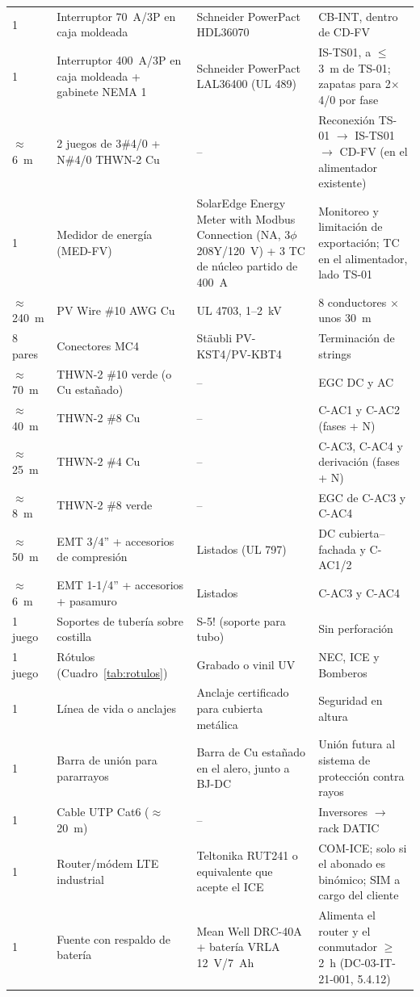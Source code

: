 \documentclass[12pt]{article}
\begin{document}
{\begin{longtable}{L{1.4cm}L{4.3cm}L{4.4cm}L{4.2cm}}
1 & Interruptor 70~A/3P en caja moldeada & Schneider PowerPact HDL36070 & CB-INT, dentro de CD-FV\\
1 & Interruptor 400~A/3P en caja moldeada + gabinete NEMA 1 & Schneider PowerPact LAL36400 (UL 489) & IS-TS01, a $\leq$ 3~m de TS-01; zapatas para 2$\times$4/0 por fase\\
$\approx$6~m & 2 juegos de 3\#4/0 + N\#4/0 THWN-2 Cu & -- & Reconexión TS-01 $\rightarrow$ IS-TS01 $\rightarrow$ CD-FV (en el alimentador existente)\\
1 & Medidor de energía (MED-FV) & SolarEdge Energy Meter with Modbus Connection (NA, 3$\phi$ 208Y/120~V) + 3 TC de núcleo partido de 400~A & Monitoreo y limitación de exportación; TC en el alimentador, lado TS-01\\
$\approx$240~m & PV Wire \#10 AWG Cu & UL 4703, 1--2~kV & 8 conductores $\times$ unos 30~m\\
8 pares & Conectores MC4 & Stäubli PV-KST4/PV-KBT4 & Terminación de strings\\
$\approx$70~m & THWN-2 \#10 verde (o Cu estañado) & -- & EGC DC y AC\\
$\approx$40~m & THWN-2 \#8 Cu & -- & C-AC1 y C-AC2 (fases + N)\\
$\approx$25~m & THWN-2 \#4 Cu & -- & C-AC3, C-AC4 y derivación (fases + N)\\
$\approx$8~m & THWN-2 \#8 verde & -- & EGC de C-AC3 y C-AC4\\
$\approx$50~m & EMT 3/4'' + accesorios de compresión & Listados (UL 797) & DC cubierta--fachada y C-AC1/2\\
$\approx$6~m & EMT 1-1/4'' + accesorios + pasamuro & Listados & C-AC3 y C-AC4\\
1 juego & Soportes de tubería sobre costilla & S-5! (soporte para tubo) & Sin perforación\\
1 juego & Rótulos (Cuadro~\ref{tab:rotulos}) & Grabado o vinil UV & NEC, ICE y Bomberos\\
1 & Línea de vida o anclajes & Anclaje certificado para cubierta metálica & Seguridad en altura\\
1 & Barra de unión para pararrayos & Barra de Cu estañado en el alero, junto a BJ-DC & Unión futura al sistema de protección contra rayos\\
1 & Cable UTP Cat6 ($\approx$20~m) & -- & Inversores $\rightarrow$ rack DATIC\\
1 & Router/módem LTE industrial & Teltonika RUT241 o equivalente que acepte el ICE & COM-ICE; solo si el abonado es binómico; SIM a cargo del cliente\\
1 & Fuente con respaldo de batería & Mean Well DRC-40A + batería VRLA 12~V/7~Ah & Alimenta el router y el conmutador $\geq$ 2~h (DC-03-IT-21-001, 5.4.12)\\
\bottomrule
\end{longtable}}
\end{document}
